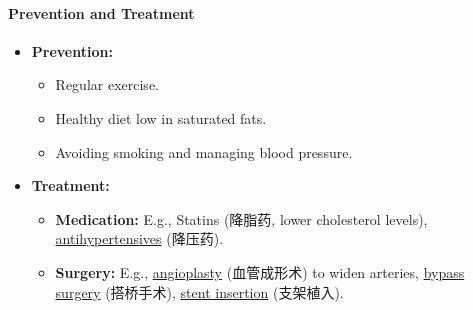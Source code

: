 \paragraph{Prevention and Treatment}
\begin{itemize}
    \item \textbf{Prevention:}
    \begin{itemize}
        \item Regular exercise.
        \item Healthy diet low in saturated fats.
        \item Avoiding smoking and managing blood pressure.
    \end{itemize}
    \item \textbf{Treatment:}
    \begin{itemize}
        \item \textbf{Medication:} E.g., Statins (降脂药, lower cholesterol levels), \underline{antihypertensives} (降压药).
        \item \textbf{Surgery:} E.g., \underline{angioplasty} (血管成形术) to widen arteries, \underline{bypass surgery} (搭桥手术),
        \underline{stent insertion} (支架植入).
    \end{itemize}
\end{itemize}